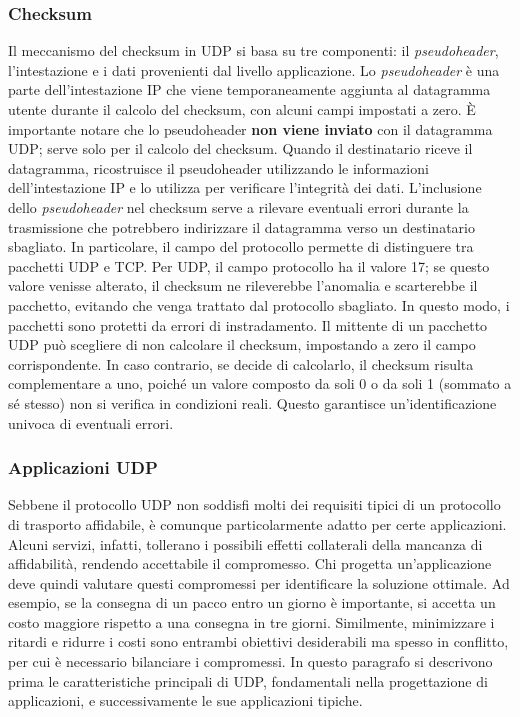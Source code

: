 \documentclass[12pt]{report}
\begin{document}
	\subsubsection{Checksum}
	Il meccanismo del checksum in UDP si basa su tre componenti: il \textit{pseudoheader}, l’intestazione e i dati provenienti dal livello applicazione. Lo \textit{pseudoheader} è una parte dell’intestazione IP che viene temporaneamente aggiunta al datagramma utente durante il calcolo del checksum, con alcuni campi impostati a zero. È importante notare che lo pseudoheader \textbf{non viene inviato} con il datagramma UDP; serve solo per il calcolo del checksum. Quando il destinatario riceve il datagramma, ricostruisce il pseudoheader utilizzando le informazioni dell’intestazione IP e lo utilizza per verificare l'integrità dei dati. L’inclusione dello \textit{pseudoheader} nel checksum serve a rilevare eventuali errori durante la trasmissione che potrebbero indirizzare il datagramma verso un destinatario sbagliato. In particolare, il campo del protocollo permette di distinguere tra pacchetti UDP e TCP. Per UDP, il campo protocollo ha il valore 17; se questo valore venisse alterato, il checksum ne rileverebbe l’anomalia e scarterebbe il pacchetto, evitando che venga trattato dal protocollo sbagliato. In questo modo, i pacchetti sono protetti da errori di instradamento. Il mittente di un pacchetto UDP può scegliere di non calcolare il checksum, impostando a zero il campo corrispondente. In caso contrario, se decide di calcolarlo, il checksum risulta complementare a uno, poiché un valore composto da soli 0 o da soli 1 (sommato a sé stesso) non si verifica in condizioni reali. Questo garantisce un’identificazione univoca di eventuali errori.

	\subsubsection{Applicazioni UDP}
	Sebbene il protocollo UDP non soddisfi molti dei requisiti tipici di un protocollo di trasporto affidabile, è comunque particolarmente adatto per certe applicazioni. Alcuni servizi, infatti, tollerano i possibili effetti collaterali della mancanza di affidabilità, rendendo accettabile il compromesso. Chi progetta un’applicazione deve quindi valutare questi compromessi per identificare la soluzione ottimale. Ad esempio, se la consegna di un pacco entro un giorno è importante, si accetta un costo maggiore rispetto a una consegna in tre giorni. Similmente, minimizzare i ritardi e ridurre i costi sono entrambi obiettivi desiderabili ma spesso in conflitto, per cui è necessario bilanciare i compromessi. In questo paragrafo si descrivono prima le caratteristiche principali di UDP, fondamentali nella progettazione di applicazioni, e successivamente le sue applicazioni tipiche.
\end{document}
